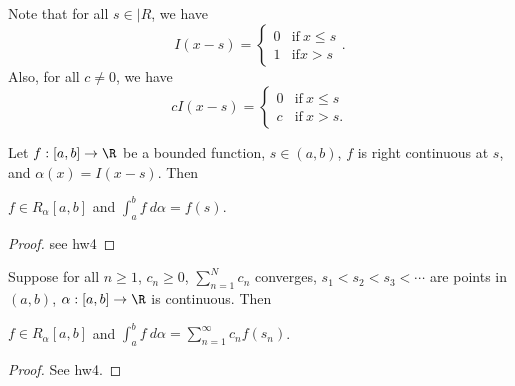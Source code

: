 \begin{remark}
    Note that for all \( s \in |R  \), we have 
    \[  I(x-s) = 
    \begin{cases}
        0 &\text{if} \ x \leq s \\
        1 &\text{if} x > s 
    \end{cases}. \]
    Also, for all \( c \neq 0  \), we have
    \[  c I(x-s) = 
    \begin{cases}
        0 &\text{if} \ x \leq s \\
        c &\text{if} \ x > s.
    \end{cases} \]
\end{remark}

\begin{theorem}[Rudin 6.15]
    Let \( f: [a,b] \to \R  \) be a bounded function, \( s \in (a,b) \), \( f  \) is right continuous at \( s  \), and \( \alpha(x) = I(x-s) \). Then 
    \begin{center}
    \( f \in {R}_{\alpha}[a,b] \) and \( \displaystyle \int_{ a }^{ b }  f  \ d \alpha  = f(s) \).
    \end{center}
\end{theorem}
\begin{proof}
see hw4
\end{proof}

\begin{theorem}[Rudin 6.16]
    Suppose for all \( n \geq 1  \), \( {c}_{n} \geq 0  \), \( \displaystyle \sum_{ n=1  }^{ N  } {c}_{n} \) converges, \( {s}_{1} < {s}_{2} < {s}_{3} < \cdots   \) are points in \( (a,b) \), \( \alpha:[a,b] \to \R  \) is continuous. Then
    \begin{center}
        \( f \in {R}_{\alpha}[a,b] \) and \( \displaystyle \int_{ a }^{ b } f  \ d \alpha = \displaystyle \sum_{ n=1  }^{ \infty  } {c}_{n} f({s}_{n})  \).
    \end{center}
\end{theorem}
\begin{proof}
See hw4.
\end{proof}



